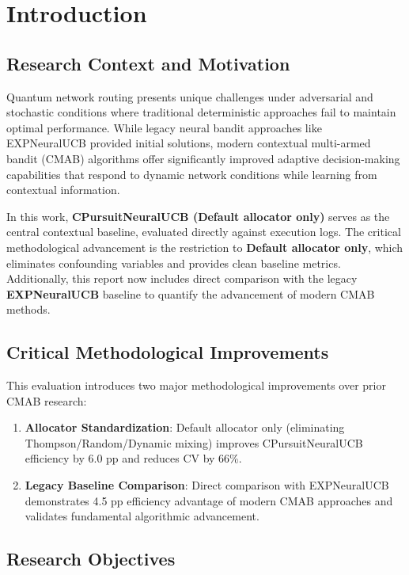 \documentclass[12pt,a4paper]{article}
\newcommand{\primarytext}[1]{\textcolor{primaryblue}{\textbf{#1}}}
\newcommand{\legacy}[1]{\textcolor{legacycolor}{\textbf{#1}}}
\begin{document}
\newpage
\section{Introduction}

\subsection{Research Context and Motivation}

Quantum network routing presents unique challenges under adversarial and stochastic conditions where traditional deterministic approaches fail to maintain optimal performance. While legacy neural bandit approaches like EXPNeuralUCB provided initial solutions, modern contextual multi-armed bandit (CMAB) algorithms offer significantly improved adaptive decision-making capabilities that respond to dynamic network conditions while learning from contextual information.

In this work, \primarytext{CPursuitNeuralUCB (Default allocator only)} serves as the central contextual baseline, evaluated directly against execution logs. The critical methodological advancement is the restriction to \textbf{Default allocator only}, which eliminates confounding variables and provides clean baseline metrics. Additionally, this report now includes direct comparison with the legacy \legacy{EXPNeuralUCB} baseline to quantify the advancement of modern CMAB methods.

\subsection{Critical Methodological Improvements}

This evaluation introduces two major methodological improvements over prior CMAB research:

\begin{enumerate}
    \item \textbf{Allocator Standardization}: Default allocator only (eliminating Thompson/Random/Dynamic mixing) improves CPursuitNeuralUCB efficiency by 6.0 pp and reduces CV by 66\%.
    
    \item \textbf{Legacy Baseline Comparison}: Direct comparison with EXPNeuralUCB demonstrates 4.5 pp efficiency advantage of modern CMAB approaches and validates fundamental algorithmic advancement.
\end{enumerate}

\subsection{Research Objectives}
\end{document}
